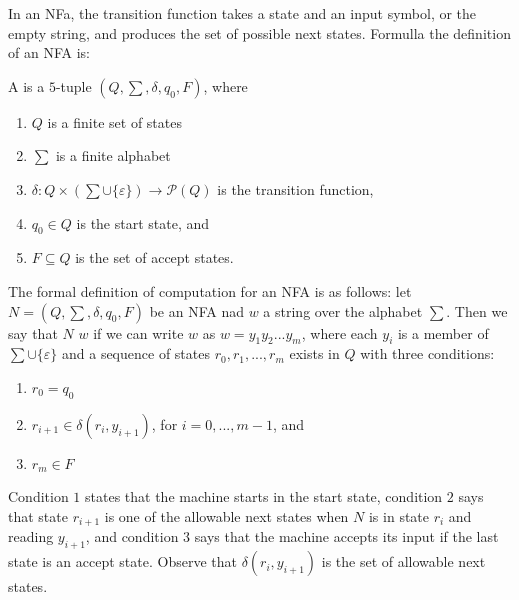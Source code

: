 \documentclass[12pt, a4paper, oneside, openright, titlepage]{book}
\begin{document}
In an NFa, the transition function takes a state and an input symbol, or the empty string, and produces the set of possible next states. Formulla the definition of an NFA is: 
\begin{defn}
    A  is a $5$-tuple $(Q,\sum,\delta,q_0,F)$, where \begin{enumerate}
        \item $Q$ is a finite set of states
        \item $\sum$ is a finite alphabet
        \item $\delta:Q\times (\sum\cup\{\varepsilon\})\rightarrow \mathcal{P}(Q)$ is the transition function,
        \item $q_0 \in Q$ is the start state, and 
        \item $F \subseteq Q$ is the set of accept states.
    \end{enumerate}
\end{defn}

The formal definition of computation for an NFA is as follows: let $N = (Q,\sum,\delta,q_0,F)$ be an NFA nad $w$ a string over the alphabet $\sum$. Then we say that $N$  $w$ if we can write $w$ as $w = y_1y_2...y_m$, where each $y_i$ is a member of $\sum\cup \{\varepsilon\}$ and a sequence of states $r_0,r_1,...,r_m$ exists in $Q$ with three conditions: \begin{enumerate}
    \item $r_0 = q_0$
    \item $r_{i+1} \in \delta(r_i,y_{i+1})$, for $i = 0,...,m-1$, and 
    \item $r_m \in F$
\end{enumerate}
Condition $1$ states that the machine starts in the start state, condition $2$ says that state $r_{i+1}$ is one of the allowable next states when $N$ is in state $r_i$ and reading $y_{i+1}$, and condition $3$ says that the machine accepts its input if the last state is an accept state. Observe that $\delta(r_i,y_{i+1})$ is the set of allowable next states.
\end{document}
